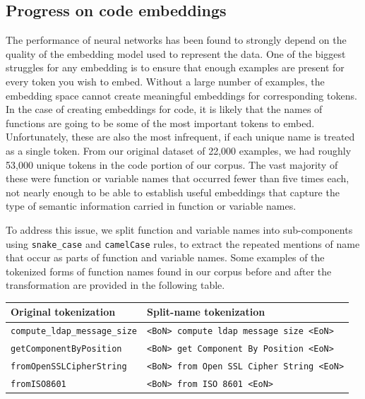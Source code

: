 \documentclass[article, 12pt, oneside]{memoir}
\begin{document}



\hypertarget{progress-on-code-embeddings}{%
\subsection{Progress on code
embeddings}\label{progress-on-code-embeddings}}

The performance of neural networks has been found to strongly depend on
the quality of the embedding model used to represent the data. One of
the biggest struggles for any embedding is to ensure that enough
examples are present for every token you wish to embed. Without a large
number of examples, the embedding space cannot create meaningful
embeddings for corresponding tokens. In the case of creating embeddings
for code, it is likely that the names of functions are going to
be some of the most important tokens to embed. Unfortunately, these
are also the most infrequent, if each unique name is treated as a single
token. From our original dataset of 22,000 examples, we had roughly
53,000 unique tokens in the code portion of our corpus. The vast
majority of these were function or variable names that occurred fewer
than five times each, not nearly enough to be able to establish useful
embeddings that capture the type of semantic information carried in
function or variable names.

To address this issue, we split function and variable names into
sub-components using \texttt{snake\_case} and \texttt{camelCase} rules,
to extract the repeated mentions of name that occur as parts of function
and variable names. Some examples of the tokenized forms of function
names found in our corpus before and after the transformation are
provided in the following table.

\begin{longtable}[]{@{}ll@{}}
\toprule
Original tokenization & Split-name tokenization\tabularnewline
\midrule
\endhead
\texttt{compute\_ldap\_message\_size} &
\texttt{\textless{}BoN\textgreater{}\ compute\ ldap\ message\ size\ \textless{}EoN\textgreater{}}\tabularnewline
\texttt{getComponentByPosition} &
\texttt{\textless{}BoN\textgreater{}\ get\ Component\ By\ Position\ \textless{}EoN\textgreater{}}\tabularnewline
\texttt{fromOpenSSLCipherString} &
\texttt{\textless{}BoN\textgreater{}\ from\ Open\ SSL\ Cipher\ String\ \textless{}EoN\textgreater{}}\tabularnewline
\texttt{fromISO8601} &
\texttt{\textless{}BoN\textgreater{}\ from\ ISO\ 8601\ \textless{}EoN\textgreater{}}\tabularnewline
\bottomrule
\end{longtable}
\end{document}
